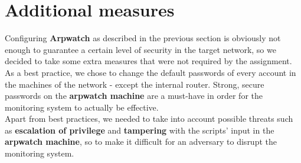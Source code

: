 \section{Additional measures}
Configuring \textbf{Arpwatch} as described in the previous section is obviously not enough to guarantee a certain level of security in the target network, so we decided to take some extra measures that were not required by the assignment.\\
As a best practice, we chose to change the default passwords of every account in the machines of the network - except the internal router. Strong, secure passwords on the \textbf{arpwatch machine} are a must-have in order for the monitoring system to actually be effective.\\
Apart from best practices, we needed to take into account possible threats such as \textbf{escalation of privilege} and \textbf{tampering} with the scripts' input in the \textbf{arpwatch machine}, so to make it difficult for an adversary to disrupt the monitoring system.

